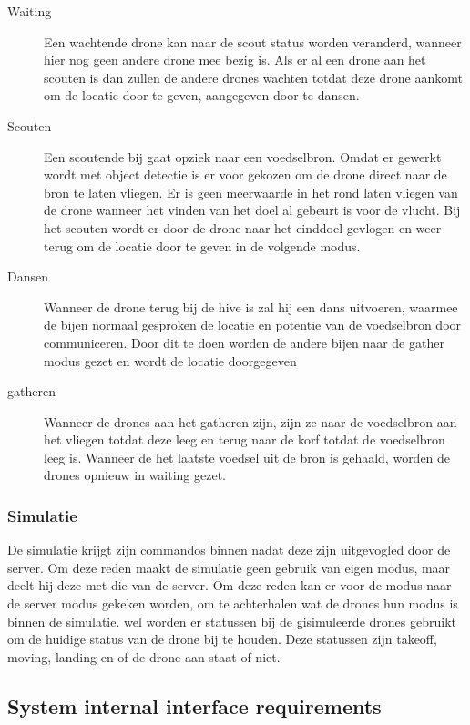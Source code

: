 \begin{description}
    \item[Waiting]
    Een wachtende drone kan naar de scout status worden veranderd, wanneer hier nog geen andere drone mee bezig is.
    Als er al een drone aan het scouten is dan zullen de andere drones wachten totdat deze drone aankomt om de locatie
    door te geven, aangegeven door te dansen. 
    
    \item[Scouten]
    Een scoutende bij gaat opziek naar een voedselbron. Omdat er gewerkt wordt met object detectie
    is er voor gekozen om de drone direct naar de bron te laten vliegen. Er is geen meerwaarde in het rond laten 
    vliegen van de drone wanneer het vinden van het doel al gebeurt is voor de vlucht. 
    Bij het scouten wordt er door de drone naar het einddoel gevlogen en weer terug om de locatie door te geven in de volgende modus.
    
    \item[Dansen]
    Wanneer de drone terug bij de hive is zal hij een dans uitvoeren, waarmee de bijen normaal gesproken 
    de locatie en potentie van de voedselbron door communiceren. Door dit te doen worden de andere bijen naar de gather modus gezet
    en wordt de locatie doorgegeven
    
    \item[gatheren]  
    Wanneer de drones aan het gatheren zijn, zijn ze naar de voedselbron aan het vliegen totdat deze leeg en terug naar
    de korf totdat de voedselbron leeg is. Wanneer de het laatste voedsel uit de bron is gehaald, 
    worden de drones opnieuw in waiting gezet.
\end{description}

\subsubsection*{Simulatie}
De simulatie krijgt zijn commandos binnen nadat deze zijn uitgevogled door de server. Om deze reden maakt de simulatie geen gebruik van eigen modus, 
maar deelt hij deze met die van de server. Om deze reden kan er voor de modus naar de server modus gekeken worden, 
om te achterhalen wat de drones hun modus is binnen de simulatie. wel worden er statussen bij de gisimuleerde drones gebruikt om de huidige status van
de drone bij te houden. Deze statussen zijn takeoff, moving, landing en of de drone aan staat of niet.


\subsection{System internal interface requirements}

